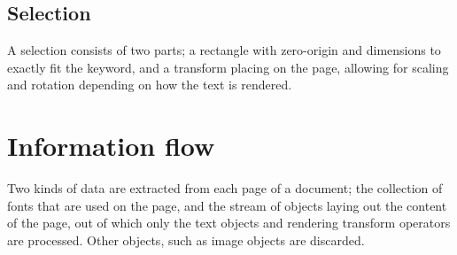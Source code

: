 \documentclass[12pt,a4paper]{article}
\begin{document}
\subsection{Selection}

A selection consists of two parts; a rectangle with zero-origin and dimensions to exactly fit the keyword, and a transform placing on the page, allowing for scaling and rotation depending on how the text is rendered.

\section{Information flow}
Two kinds of data are extracted from each page of a document; the collection of fonts that are used on the page, and the stream of objects laying out the content of the page, out of which only the text objects and rendering transform operators are processed. Other objects, such as image objects are discarded.

\subsection{}
\end{document}

